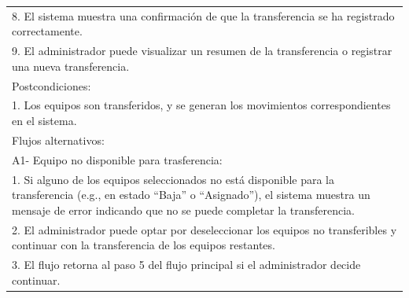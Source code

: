 \documentclass[stu, 12pt, letterpaper, donotrepeattitle, floatsintext, natbib]{apa7}
\begin{document}
\begin{longtable}{@{} p{16.5cm} @{}}
    8. El sistema muestra una confirmaci\'on de que la transferencia se ha registrado correctamente.                                                                                                                                         \\
    9. El administrador puede visualizar un resumen de la transferencia o registrar una nueva transferencia.                                                                                                                                 \\ \midrule
    Postcondiciones:                                                                                                                                                                                                                         \\
    1. Los equipos son transferidos, y se generan los movimientos correspondientes en el sistema.                                                                                                                                            \\ \midrule
    Flujos alternativos:                                                                                                                                                                                                                     \\
    A1- Equipo no disponible para trasferencia:                                                                                                                                                                                              \\
    \hspace{1cm}1. Si alguno de los equipos seleccionados no est\'a disponible para la transferencia (e.g., en estado ``Baja'' o ``Asignado''), el sistema muestra un mensaje de error indicando que no se puede completar la transferencia. \\
    \hspace{1cm}2. El administrador puede optar por deseleccionar los equipos no transferibles y continuar con la transferencia de los equipos restantes.                                                                                    \\
    \hspace{1cm}3. El flujo retorna al paso 5 del flujo principal si el administrador decide continuar.                                                                                                                                      \\

\end{longtable}
\end{document}
